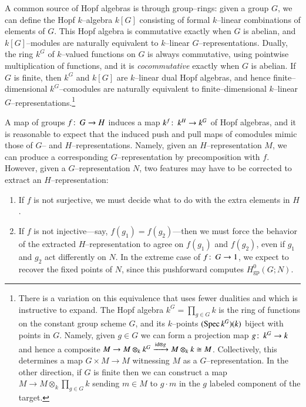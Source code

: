 \begin{example}\label{HopfAlgebrasFromFiniteGroups}
A common source of Hopf algebras is through group--rings: given a group $G$, we can define the Hopf $k$--algebra $k[G]$ consisting of formal $k$--linear combinations of elements of $G$.  This Hopf algebra is commutative exactly when $G$ is abelian, and $k[G]$--modules are naturally equivalent to $k$--linear $G$--representations.  Dually, the ring $k^G$ of $k$--valued functions on $G$ is always commutative, using pointwise multiplication of functions, and it is \emph{cocommutative} exactly when $G$ is abelian.  If $G$ is finite, then $k^G$ and $k[G]$ are $k$--linear dual Hopf algebras, and hence finite--dimensional $k^G$--comodules are naturally equivalent to finite--dimensional $k$--linear $G$--representations.\footnote{There is a variation on this equivalence that uses fewer dualities and which is instructive to expand.  The Hopf algebra $k^G = \prod_{g \in G} k$ is the ring of functions on the constant group scheme $G$, and its $k$--points $(\operatorname{Spec} k^G)(k)$ biject with points in $G$.  Namely, given $g \in G$ we can form a projection map $g\colon\thinspace k^G \to k$ and hence a composite $M \to M \otimes_k k^G \xrightarrow{\mathrm{id} \otimes g} M \otimes_k k \cong M$.  Collectively, this determines a map $G \times M \to M$ witnessing $M$ as a $G$--representation.  In the other direction, if $G$ is finite then we can construct a map $M \to M \otimes_k \prod_{g \in G} k$ sending $m \in M$ to $g \cdot m$ in the $g${\th} labeled component of the target.}

A map of groups $f\colon\thinspace G \to H$ induces a map $k^f\colon\thinspace k^H \to k^G$ of Hopf algebras, and it is reasonable to expect that the induced push and pull maps of comodules mimic those of $G$-- and $H$--representations.  Namely, given an $H$--representation $M$, we can produce a corresponding $G$--representation by precomposition with $f$.  However, given a $G$--representation $N$, two features may have to be corrected to extract an $H$--representation:
\begin{enumerate}
\item If $f$ is not surjective, we must decide what to do with the extra elements in $H$.
\item If $f$ is not injective---say, $f(g_1) = f(g_2)$---then we must force the behavior of the extracted $H$--representation to agree on $f(g_1)$ and $f(g_2)$, even if $g_1$ and $g_2$ act differently on $N$.  In the extreme case of $f\colon\thinspace G \to 1$, we expect to recover the fixed points of $N$, since this pushforward computes $H^0_{\mathrm{gp}}(G; N)$.
\end{enumerate}
\end{example}

